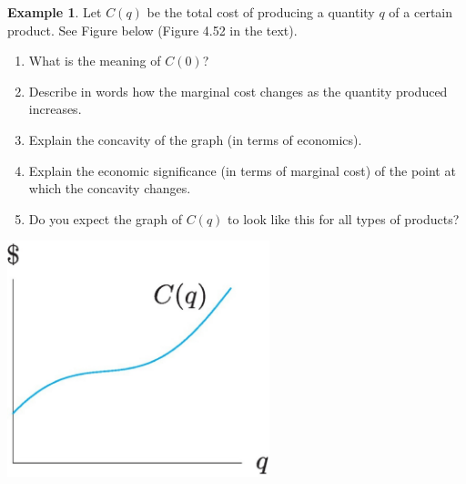 \documentclass[oneside]{book}
\theoremstyle{definition}
\newtheorem{example}{Example}
\theoremstyle{solution}
\begin{document}
\begin{example}
  Let $C(q)$ be the total cost of producing a quantity $q$ of a
  certain product. See Figure below (Figure 4.52 in the text).
  \begin{enumerate}
  \item What is the meaning of $C(0)$?
  \item Describe in words how the marginal cost changes as the
    quantity produced increases.
  \item Explain the concavity of the graph (in terms of economics).
  \item Explain the economic significance (in terms of marginal cost)
    of the point at which the concavity changes.
  \item Do you expect the graph of $C(q)$ to look like this for all
    types of products?
  \end{enumerate}
  \begin{center}
\includegraphics[width=3in]{Images/s4-4prob6}
\end{center}
\end{example}
\end{document}
